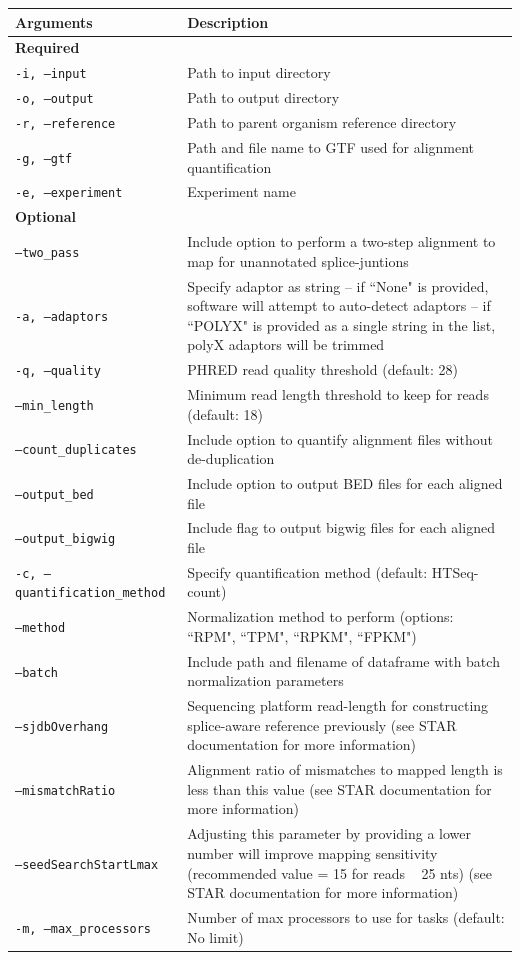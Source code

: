 \documentclass[11pt, a4paper, oneside]{article}
\begin{document}
\begin{tabular}{p{5cm}p{13cm}}
 \textbf{Arguments} & \textbf{Description} \\
 \hline
 \textbf{Required} & \\
 \hline
 \texttt{-i, --input} & Path to input directory \\
 \hline
 \texttt{-o, --output} & Path to output directory \\
 \hline
 \texttt{-r, --reference} & Path to parent organism reference directory \\
 \hline
 \texttt{-g, --gtf} & Path and file name to GTF used for alignment quantification \\
 \hline
 \texttt{-e, --experiment} & Experiment name \\
 \hline
 \textbf{Optional} & \\
 \hline
 \texttt{--two\_pass} & Include option to perform a two-step alignment to map for unannotated splice-juntions \\
 \hline
 \texttt{-a, --adaptors} & Specify adaptor as string -- if ``None" is provided, software will attempt to auto-detect adaptors -- if ``POLYX" is provided as a single string in the list, polyX adaptors will be trimmed \\
 \hline
 \texttt{-q, --quality} & PHRED read quality threshold (default: 28) \\
 \hline
 \texttt{--min\_length} & Minimum read length threshold to keep for reads (default: 18) \\
 \hline
 \texttt{--count\_duplicates} & Include option to quantify alignment files without de-duplication \\
 \hline
 \texttt{--output\_bed} & Include option to output BED files for each aligned file \\
 \hline
 \texttt{--output\_bigwig} & Include flag to output bigwig files for each aligned file \\
 \hline
 \texttt{-c, --quantification\_method} & Specify quantification method (default: HTSeq-count\cite{htseq}) \\
 \hline
 \texttt{--method} & Normalization method to perform (options: ``RPM", ``TPM", ``RPKM", ``FPKM") \\
 \hline
 \texttt{--batch} & Include path and filename of dataframe with batch normalization parameters \\
 \hline
 \texttt{--sjdbOverhang} & Sequencing platform read-length for constructing splice-aware reference previously (see STAR documentation for more information) \\
 \hline
 \texttt{--mismatchRatio} & Alignment ratio of mismatches to mapped length is less than this value (see STAR documentation for more information) \\
 \hline
 \texttt{--seedSearchStartLmax} & Adjusting this parameter by providing a lower number will improve mapping sensitivity (recommended value = 15 for reads ~ 25 nts) (see STAR documentation for more information) \\
 \hline
 \texttt{-m, --max\_processors} & Number of max processors to use for tasks (default: No limit) \\
\end{tabular}
\end{document}
